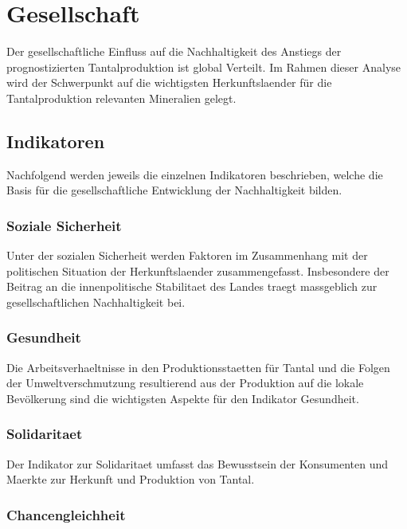 \section{Gesellschaft}\label{sec:society}

Der gesellschaftliche Einfluss auf die Nachhaltigkeit des Anstiegs der
prognostizierten Tantalproduktion ist global Verteilt. Im Rahmen dieser Analyse
wird der Schwerpunkt auf die wichtigsten Herkunftslaender für die
Tantalproduktion relevanten Mineralien gelegt.


\subsection{Indikatoren}

Nachfolgend werden jeweils die einzelnen Indikatoren beschrieben, welche die
Basis für die gesellschaftliche Entwicklung der Nachhaltigkeit bilden.

\subsubsection{Soziale Sicherheit}

Unter der sozialen Sicherheit werden Faktoren im Zusammenhang mit der
politischen Situation der Herkunftslaender zusammengefasst. Insbesondere der
Beitrag an die innenpolitische Stabilitaet des Landes traegt massgeblich zur
gesellschaftlichen Nachhaltigkeit bei.

\subsubsection{Gesundheit}

Die Arbeitsverhaeltnisse in den Produktionsstaetten für Tantal und die Folgen der
Umweltverschmutzung resultierend aus der Produktion auf die lokale Bevölkerung
sind die wichtigsten Aspekte für den Indikator Gesundheit.

\subsubsection{Solidaritaet}

Der Indikator zur Solidaritaet umfasst das Bewusstsein der Konsumenten und
Maerkte zur Herkunft und Produktion von Tantal.

\subsubsection{Chancengleichheit}

